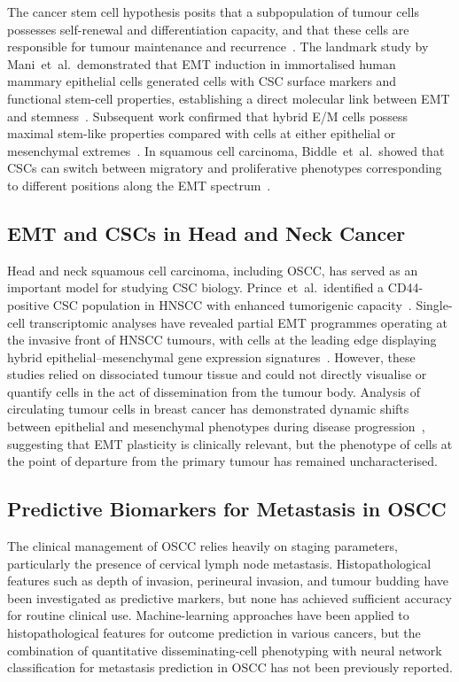\documentclass[11pt,a4paper]{article}
\begin{document}
The cancer stem cell hypothesis posits that a subpopulation of tumour cells possesses self-renewal and differentiation capacity, and that these cells are responsible for tumour maintenance and recurrence~\cite{al-hajj2003}. The landmark study by Mani~et~al.\ demonstrated that EMT induction in immortalised human mammary epithelial cells generated cells with CSC surface markers and functional stem-cell properties, establishing a direct molecular link between EMT and stemness~\cite{mani2008}. Subsequent work confirmed that hybrid E/M cells possess maximal stem-like properties compared with cells at either epithelial or mesenchymal extremes~\cite{grosse-wilde2015}. In squamous cell carcinoma, Biddle~et~al.\ showed that CSCs can switch between migratory and proliferative phenotypes corresponding to different positions along the EMT spectrum~\cite{biddle2011}.

\subsection{EMT and CSCs in Head and Neck Cancer}

Head and neck squamous cell carcinoma, including OSCC, has served as an important model for studying CSC biology. Prince~et~al.\ identified a CD44-positive CSC population in HNSCC with enhanced tumorigenic capacity~\cite{prince2007}. Single-cell transcriptomic analyses have revealed partial EMT programmes operating at the invasive front of HNSCC tumours, with cells at the leading edge displaying hybrid epithelial--mesenchymal gene expression signatures~\cite{puram2017}. However, these studies relied on dissociated tumour tissue and could not directly visualise or quantify cells in the act of dissemination from the tumour body. Analysis of circulating tumour cells in breast cancer has demonstrated dynamic shifts between epithelial and mesenchymal phenotypes during disease progression~\cite{yu2013}, suggesting that EMT plasticity is clinically relevant, but the phenotype of cells at the point of departure from the primary tumour has remained uncharacterised.

\subsection{Predictive Biomarkers for Metastasis in OSCC}

The clinical management of OSCC relies heavily on staging parameters, particularly the presence of cervical lymph node metastasis. Histopathological features such as depth of invasion, perineural invasion, and tumour budding have been investigated as predictive markers, but none has achieved sufficient accuracy for routine clinical use. Machine-learning approaches have been applied to histopathological features for outcome prediction in various cancers, but the combination of quantitative disseminating-cell phenotyping with neural network classification for metastasis prediction in OSCC has not been previously reported.
\end{document}
